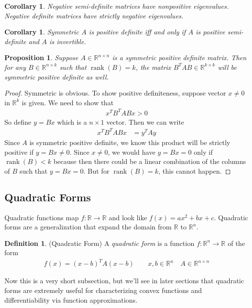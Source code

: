 \documentclass[12pt]{article}
\numberwithin{equation}{section} %
\theoremstyle{plain}
\newtheorem{prop}[thm]{Proposition}
\newtheorem{cor}[thm]{Corollary}
\theoremstyle{definition}
\newtheorem{defn}[thm]{Definition}
\theoremstyle{remark}
\newcommand{\R}{\mathbb{R}}
\newcommand{\Rn}{\mathbb{R}^n}
\newcommand{\Rk}{\mathbb{R}^k}
\newcommand{\Rnn}{\mathbb{R}^{n\times n}}
\newcommand{\Rnk}{\mathbb{R}^{n\times k}}
\newcommand{\Rkk}{\mathbb{R}^{k\times k}}
\newcommand{\rank}{\operatorname{rank}}
\begin{document}
\begin{cor}
Negative semi-definite matrices have nonpositive eigenvalues. Negative
definite matrices have strictly negative eigenvalues.
\end{cor}

\begin{cor}
Symmetric $A$ is positive definite iff and only if $A$ is positive
\emph{semi}-definite and $A$ is invertible.
\end{cor}

\begin{prop}
Suppose $A\in\Rnn$ is a symmetric positive definite matrix. Then for any
$B\in\Rnk$ such that $\rank(B)=k$, the matrix $B^TAB\in\Rkk$ will be
symmetric positive definite as well.
\end{prop}
\begin{proof}
Symmetric is obvious. To show positive definiteness,
suppose vector $x \neq 0$ in $\Rk$ is given. We need to show that
\begin{align*}
  x^T B^TABx >0
\end{align*}
So define $y=Bx$ which is a $n\times 1$ vector. Then we can write
\begin{align*}
  x^TB^TABx &= y^TAy
\end{align*}
Since $A$ is symmetric positive definite, we know this product will be
strictly positive if $y=Bx\neq 0$. Since $x\neq 0$, we would have
$y=Bx=0$ only if $\rank(B)<k$ because then there could be a linear
combination of the columns of $B$ such that $y=Bx=0$. But for
$\rank(B)=k$, this cannot happen.
\end{proof}


\subsection{Quadratic Forms}

Quadratic functions map $f:\R\rightarrow\R$ and look like $f(x)=ax^2 +
bx+c$. Quadratic forms are a generalization that expand the domain from
$\R$ to $\Rn$.

\begin{defn}{(Quadratic Form)}
A \emph{quadratic form} is a function $f:\Rn\rightarrow\R$ of the form
\begin{align*}
  f(x) = (x-b)^TA(x-b)
  \qquad x,b\in\Rn \quad A\in\Rnn
\end{align*}
\end{defn}

Now this is a very short subsection, but we'll see in later sections
that quadratic forms are extremely useful for characterizing convex
functions and differentiability via function approximations.
\end{document}
